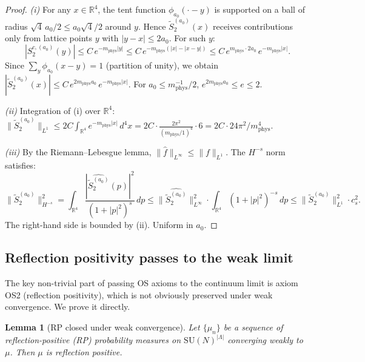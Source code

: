 \documentclass[11pt,a4paper]{amsart}
\newtheorem{lemma}[theorem]{Lemma}
\theoremstyle{definition}
\newcommand{\SU}{\mathrm{SU}}
\newcommand{\R}{\mathbb{R}}
\begin{document}
\begin{proof}
\emph{(i)} For any $x \in \R^4$, the tent function $\phi_{a_0}(\cdot - y)$ is
supported on a ball of radius $\sqrt{4}\,a_0/2 \le a_0\sqrt{4}/2$ around $y$.
Hence $\widetilde{S}_2^{(a_0)}(x)$ receives contributions only from lattice
points $y$ with $|y - x| \le 2a_0$.  For such $y$:
\[
  |S_2^{c,(a_0)}(y)| \le C\,e^{-m_{\mathrm{phys}}|y|}
  \le C\,e^{-m_{\mathrm{phys}}(|x| - |x-y|)}
  \le C\,e^{m_{\mathrm{phys}}\cdot 2a_0}\,e^{-m_{\mathrm{phys}}|x|}.
\]
Since $\sum_y \phi_{a_0}(x-y) = 1$ (partition of unity), we obtain
$|\widetilde{S}_2^{(a_0)}(x)| \le C\,e^{2m_{\mathrm{phys}}a_0}\,e^{-m_{\mathrm{phys}}|x|}$.
For $a_0 \le m_{\mathrm{phys}}^{-1}/2$, $e^{2m_{\mathrm{phys}}a_0} \le e \le 2$.

\emph{(ii)} Integration of (i) over $\R^4$:
$\|\widetilde{S}_2^{(a_0)}\|_{L^1} \le 2C \int_{\R^4} e^{-m_{\mathrm{phys}}|x|}\,d^4x
= 2C\cdot\frac{2\pi^2}{(m_{\mathrm{phys}}/1)^4}\cdot 6 = 2C\cdot 24\pi^2/m_{\mathrm{phys}}^4$.

\emph{(iii)} By the Riemann--Lebesgue lemma, $\|\hat{f}\|_{L^\infty} \le \|f\|_{L^1}$.
The $H^{-s}$ norm satisfies:
\[
  \|\widetilde{S}_2^{(a_0)}\|_{H^{-s}}^2
  = \int_{\R^4} \frac{|\widehat{\widetilde{S}_2^{(a_0)}}(p)|^2}{(1+|p|^2)^s}\,dp
  \le \|\widehat{\widetilde{S}_2^{(a_0)}}\|_{L^\infty}^2
    \cdot \int_{\R^4} (1+|p|^2)^{-s}\,dp
  \le \|{\widetilde{S}_2^{(a_0)}}\|_{L^1}^2 \cdot c_s^2.
\]
The right-hand side is bounded by (ii).  Uniform in $a_0$.
\end{proof}

\subsection{Reflection positivity passes to the weak limit}
\label{sec:RP_limit}

The key non-trivial part of passing OS axioms to the continuum limit is
axiom OS2 (reflection positivity), which is not obviously preserved under
weak convergence.  We prove it directly.

\begin{lemma}[RP closed under weak convergence]
\label{lem:RP_closed}
Let $\{\mu_n\}$ be a sequence of reflection-positive (RP) probability measures
on $\SU(N)^{|\Lambda|}$ converging weakly to $\mu$.  Then $\mu$ is
reflection positive.
\end{lemma}
\end{document}
